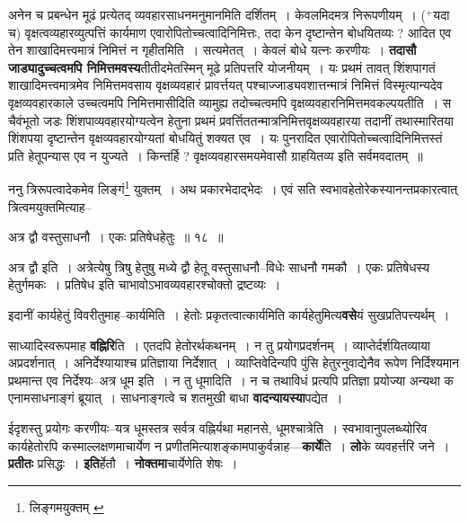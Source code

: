 \documentclass[article,12pt,a4paper]{memoir}
\newcommand{\add}[1]{($^{+}$#1)}
\begin{document}
	  \pstart अनेन च प्रबन्धेन मूढं प्रत्येतद् व्यवहारसाधनमनुमानमिति दर्शितम् । केवलमिदमत्र निरूपणीयम् । \add{यदा च} वृक्षत्वव्यहारव्युत्पत्तिं कार्यमाण एवारोपितोच्चत्वादिनिमित्तः, तदा केन दृष्टान्तेन बोधयितव्यः ? आदित एव तेन शाखादिमत्त्वमात्रं निमित्तं न गृहीतमिति । सत्यमेतत् । केवलं बोधे यत्नः करणीयः । \textbf{तदासौ जाड्यादुच्चत्वमपि निमित्तमवस्य}तीतीदमेतस्मिन् मूढे प्रतिपत्तरि योजनीयम् । यः प्रथमं तावत् शिंशपागतं शाखादिमत्त्वमात्रमेव निमित्तमवसाय वृक्षव्यवहारं प्रावर्त्तयत् पश्चाज्जाड्यवशात्तन्मात्रं निमित्तं विस्मृत्यान्यदेव वृक्षव्यवहारकाले उच्चत्वमपि निमित्तमासीदिति व्यामुह्य तदोच्चत्वमपि वृक्षव्यवहारनिमित्तमवकल्पयतीति । स चैवंभूतो जडः शिंशपाव्यवहारयोग्यत्वेन हेतुना प्रथमं प्रवर्त्तिततन्मात्रनिमित्तवृक्षव्यवहारया तदानीं तथास्मारितया शिंशपया दृष्टान्तेन वृक्षव्यवहारयोग्यतां बोधयितुं शक्यत एव । यः पुनरादित एवारोपितोच्चत्वादिनिमित्तस्तं प्रति हेतूपन्यास एव न युज्यते । किन्तर्हि ? वृक्षव्यवहारसमयमेवासौ ग्राहयितव्य इति सर्वमवदातम् ॥
	\pend
      \leavevmode{}
	  \bigskip
	  \begingroup
	

	  \pstart ननु त्रिरूपत्वादेकमेव लिङ्गं\footnote{लिङ्गमयुक्तम् \cite{dp-msB} \cite{dp-msC} \cite{dp-msD} \cite{dp-edP} \cite{dp-edH} \cite{dp-edE} \cite{dp-edN}} युक्तम् । अथ प्रकारभेदाद्भेदः । एवं सति स्वभावहेतोरेकस्यानन्तप्रकारत्वात् त्रित्वमयुक्तमित्याह--
	\pend
       
	  \bigskip
	  \begingroup
	

	  \pstart अत्र द्वौ वस्तुसाधनौ । एकः प्रतिषेधहेतुः ॥ १८ ॥
	\pend
      
	  \endgroup
	 

	  \pstart अत्र द्वौ इति । अत्रेत्येषु त्रिषु हेतुषु मध्ये द्वौ हेतू वस्तुसाधनौ--विधेः साधनौ गमकौ । एकः प्रतिषेधस्य हेतुर्गमकः । प्रतिषेध इति चाभावोऽभावव्यवहारश्चोक्तो द्रष्टव्यः ।
	\pend
      
	  \endgroup
	

	  \pstart इदानीं कार्यहेतुं विवरीतुमाह--कार्यमिति । हेतोः प्रकृतत्वात्कार्यमिति कार्यहेतुमित्य\textbf{वसे}यं सुखप्रतिपत्त्यर्थम् ।
	\pend
      

	  \pstart साध्यादिस्वरूपमाह \textbf{वह्निरि}ति । एतदपि हेतोरर्थकथनम् । न तु प्रयोगप्रदर्शनम् । व्याप्तेर्दर्शयितव्याया अप्रदर्शनात् । अनिर्देश्यायाश्च प्रतिज्ञाया निर्देशात् । व्याप्तिवेदिन्यपि पुंसि हेतुरनुवाद्येनैव रूपेण निर्दिश्यमान प्रथमान्त एव निर्देश्यः--अत्र धूम इति । न तु धूमादिति । न च तथाविधं प्रत्यपि प्रतिज्ञा प्रयोज्या अन्यथा क एनामसाधनाङ्गं ब्रूयात् । साधनाङ्गत्वे च शतमुखी बाधा \textbf{वादन्यायस्या}पद्येत ।
	\pend
      

	  \pstart ईदृशस्तु प्रयोगः करणीयः--यत्र धूमस्तत्र सर्वत्र वह्निर्यथा महानसे, धूमश्चात्रेति । स्वभावानुपलब्ध्योरिव कार्यहेतोरपि कस्माल्लक्षणमाचार्येण न प्रणीतमित्याशङ्कामपाकुर्वन्नाह—\textbf{कार्ये}ति । \textbf{लो}के व्यवहर्त्तरि जने । \textbf{प्रतीतः} प्रसिद्धः । \textbf{इति}र्हेतौ । \textbf{नोक्तमा}चार्येणेति शेषः ।
	\pend
      
\end{document}
